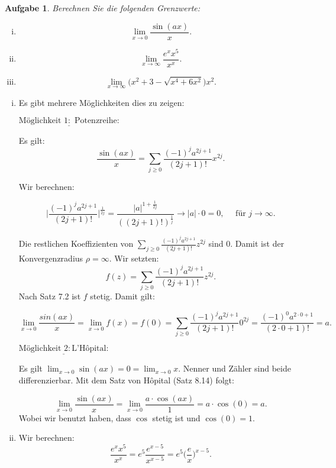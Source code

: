 \documentclass[a4paper, 20]{exam}
\newtheorem{ex}{Aufgabe}
\begin{document}
\begin{ex} Berechnen Sie die folgenden Grenzwerte:
\begin{enumerate}[i)]
\item
$$\lim_{x \rightarrow 0} \frac{\sin(ax)}{x}.$$

\item
$$\lim_{x \rightarrow \infty} \frac{e^x x^5}{x^x}.$$

\item

$$ \lim_{x\rightarrow \infty} \big( x^2+3-\sqrt{x^4+6x^2}  \big)x^2.$$
\end{enumerate}

\end{ex}
\begin{solution}
\begin{enumerate}[i)]
\item
Es gibt mehrere M\"oglichkeiten dies zu zeigen:

$ \underline{\text{M\"oglichkeit } 1: \text{ Potenzreihe:}} $

Es gilt:
$$ \frac{\sin(ax)}{x} = \sum_{j\geq 0} \frac{(-1)^j a^{2j+1}}{(2j+1)!} x^{2j}.$$

Wir berechnen:

$$ \bigg\vert \frac{(-1)^j a^{2j+1}}{(2j+1)!}  \bigg\vert^{\frac{1}{2j}}
= \frac{\vert a \vert^{1+\frac{1}{2j}}}{((2j+1)!)^{\frac{1}{j}}} 
\longrightarrow \vert a \vert \cdot 0= 0, \quad \text{ f\"ur } j\longrightarrow \infty.$$

Die restlichen Koeffizienten von $\sum_{j\geq 0} \frac{(-1)^j a^{2j+1}}{(2j+1)!} z^{2j}$ sind $0$. Damit ist der Konvergenzradius $\rho= \infty$. Wir setzten:
$$ f(z)= \sum_{j\geq 0} \frac{(-1)^j a^{2j+1}}{(2j+1)!} z^{2j} .$$
Nach Satz 7.2 ist $f$ stetig. Damit gilt:

$$ \lim_{x\rightarrow 0} \frac{sin(ax)}{x} = \lim_{x\rightarrow 0} f(x) = f(0)
= \sum_{j\geq 0} \frac{(-1)^j a^{2j+1}}{(2j+1)!} 0^{2j} 
= \frac{(-1)^0 a^{2\cdot 0+1}}{(2\cdot 0+1)!} = a.$$

$ \underline{\text{M\"oglichkeit } 2: \text{L'Hôpital:} } $

Es gilt $\lim_{x\rightarrow 0} \sin(ax)= 0 = \lim_{x\rightarrow 0} x$. Nenner und Z\"ahler sind beide differenzierbar. Mit dem Satz von Hôpital (Satz 8.14) folgt:

$$ \lim_{x\rightarrow 0} \frac{\sin(ax)}{x} = \lim_{x\rightarrow 0} \frac{a \cdot \cos(ax)}{1}
= a \cdot \cos(0)= a.$$
Wobei wir benutzt haben, dass $\cos$ stetig ist und $\cos(0)=1$.
\item
Wir berechnen:
$$ \frac{e^x x^5}{x^x} = e^5 \frac{e^{x-5}}{x^{x-5}}= e^5 \bigg(\frac{e}{x}\bigg)^{x-5}.$$


\end{enumerate}
\end{solution}
\end{document}
